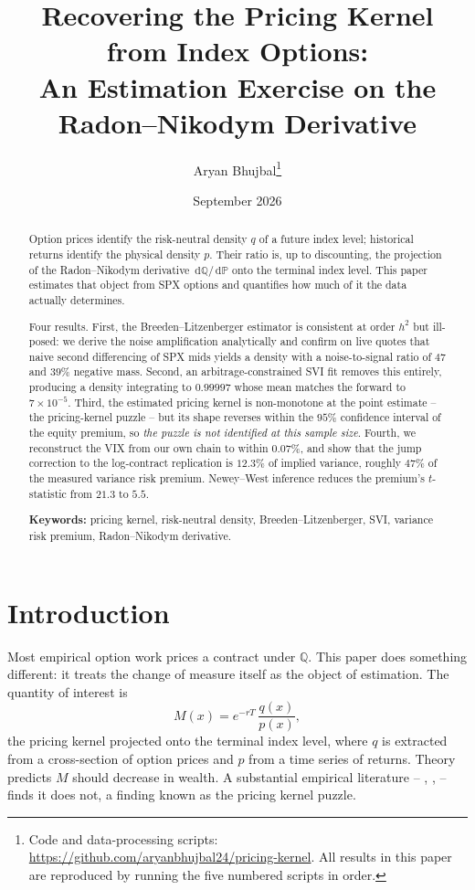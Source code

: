 \documentclass[11pt,a4paper]{article}
\title{\bfseries Recovering the Pricing Kernel from Index Options:\\[0.3em]
\large An Estimation Exercise on the Radon--Nikodym Derivative}
\author{Aryan Bhujbal\thanks{Code and data-processing scripts:
\url{https://github.com/aryanbhujbal24/pricing-kernel}. All results in this
paper are reproduced by running the five numbered scripts in order.}}
\date{September 2026}
\theoremstyle{remark}
\newcommand{\Q}{\mathbb{Q}}
\newcommand{\PP}{\mathbb{P}}
\newcommand{\dd}{\,\mathrm{d}}
\begin{document}
\maketitle

\begin{abstract}
\noindent
Option prices identify the risk-neutral density $q$ of a future index level;
historical returns identify the physical density $p$. Their ratio is, up to
discounting, the projection of the Radon--Nikodym derivative $\dd\Q/\dd\PP$
onto the terminal index level. This paper estimates that object from SPX
options and quantifies how much of it the data actually determines.

Four results. First, the Breeden--Litzenberger estimator is consistent at
order $h^2$ but ill-posed: we derive the noise amplification analytically and
confirm on live quotes that naive second differencing of SPX mids yields a
density with a noise-to-signal ratio of $47$ and $39\%$ negative mass. Second,
an arbitrage-constrained SVI fit removes this entirely, producing a density
integrating to $0.99997$ whose mean matches the forward to $7\times10^{-5}$.
Third, the estimated pricing kernel is non-monotone at the point estimate --
the pricing-kernel puzzle -- but its shape reverses within the $95\%$ confidence
interval of the equity premium, so \emph{the puzzle is not identified at this
sample size}. Fourth, we reconstruct the VIX from our own chain to within
$0.07\%$, and show that the jump correction to the log-contract replication is
$12.3\%$ of implied variance, roughly $47\%$ of the measured variance risk
premium. Newey--West inference reduces the premium's $t$-statistic from $21.3$
to $5.5$.

\medskip
\noindent\textbf{Keywords:} pricing kernel, risk-neutral density,
Breeden--Litzenberger, SVI, variance risk premium, Radon--Nikodym derivative.
\end{abstract}

\section{Introduction}

Most empirical option work prices a contract under $\Q$. This paper does
something different: it treats the change of measure itself as the object of
estimation. The quantity of interest is
\begin{equation}
M(x) = e^{-rT}\,\frac{q(x)}{p(x)},
\end{equation}
the pricing kernel projected onto the terminal index level, where $q$ is
extracted from a cross-section of option prices and $p$ from a time series of
returns. Theory predicts $M$ should decrease in wealth. A substantial empirical
literature -- \citet{jackwerth2000}, \citet{aitsahalia2000},
\citet{rosenberg2002} -- finds it does not, a finding known as the pricing
kernel puzzle.
\end{document}

